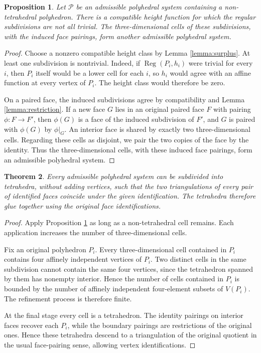 \documentclass[oneside,a4paper,12pt]{article}
\newcommand{\Reg}{\operatorname{Reg}}
\theoremstyle{plain}
\newtheorem{theorem}{Theorem}[section]
\newtheorem{proposition}[theorem]{Proposition}
\theoremstyle{definition}
\theoremstyle{remark}
\numberwithin{equation}{section}
\begin{document}
\begin{proposition}\label{proposition:one-refinement}
Let $\mathcal P$ be an admissible polyhedral system containing a non-tetrahedral polyhedron. There is a compatible height function for which the regular subdivisions are not all trivial. The three-dimensional cells of these subdivisions, with the induced face pairings, form another admissible polyhedral system.
\end{proposition}

\begin{proof}
Choose a nonzero compatible height class by Lemma \ref{lemma:surplus}. At least one subdivision is nontrivial. Indeed, if $\Reg(P_i,h_i)$ were trivial for every $i$, then $P_i$ itself would be a lower cell for each $i$, so $h_i$ would agree with an affine function at every vertex of $P_i$. The height class would therefore be zero.

On a paired face, the induced subdivisions agree by compatibility and Lemma \ref{lemma:restriction}. If a new face $G$ lies in an original paired face $F$ with pairing $\phi:F\to F'$, then $\phi(G)$ is a face of the induced subdivision of $F'$, and $G$ is paired with $\phi(G)$ by $\phi|_G$. An interior face is shared by exactly two three-dimensional cells. Regarding these cells as disjoint, we pair the two copies of the face by the identity. Thus the three-dimensional cells, with these induced face pairings, form an admissible polyhedral system.
\end{proof}

\begin{theorem}\label{theorem:affine-triangulation}
Every admissible polyhedral system can be subdivided into tetrahedra, without adding vertices, such that the two triangulations of every pair of identified faces coincide under the given identification. The tetrahedra therefore glue together using the original face identifications.
\end{theorem}

\begin{proof}
Apply Proposition \ref{proposition:one-refinement} as long as a non-tetrahedral cell remains. Each application increases the number of three-dimensional cells.

Fix an original polyhedron $P_i$. Every three-dimensional cell contained in $P_i$ contains four affinely independent vertices of $P_i$. Two distinct cells in the same subdivision cannot contain the same four vertices, since the tetrahedron spanned by them has nonempty interior. Hence the number of cells contained in $P_i$ is bounded by the number of affinely independent four-element subsets of $V(P_i)$. The refinement process is therefore finite.

At the final stage every cell is a tetrahedron. The identity pairings on interior faces recover each $P_i$, while the boundary pairings are restrictions of the original ones. Hence these tetrahedra descend to a triangulation of the
original quotient in the usual face-pairing sense, allowing
vertex identifications.
\end{proof}
\end{document}
